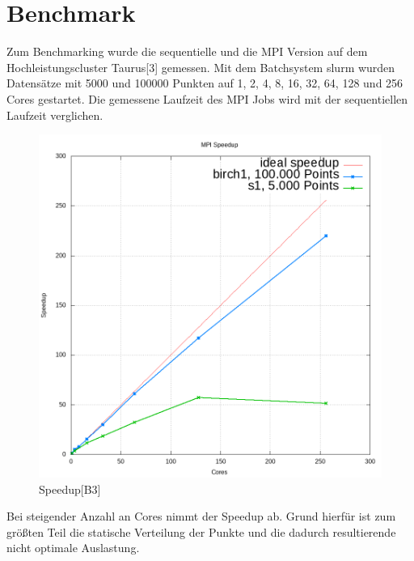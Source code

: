 \section{Benchmark}
	Zum Benchmarking wurde die sequentielle und die MPI Version auf dem Hochleistungscluster Taurus[3] gemessen. Mit dem Batchsystem slurm wurden Datensätze mit
	5000 und 100000 Punkten auf 1, 2, 4, 8, 16, 32, 64, 128 und 256 Cores gestartet. Die gemessene Laufzeit des MPI Jobs wird mit der sequentiellen
	Laufzeit verglichen.\\
	\begin{figure}[H] \centering
		\includegraphics[scale=0.69]{../meanshift/output/pics/speedup.png} 
		\caption{Speedup[B3]}
	\end{figure}
	Bei steigender Anzahl an Cores nimmt der Speedup ab. Grund hierfür ist zum größten Teil die statische Verteilung der Punkte und die dadurch
	resultierende nicht optimale Auslastung.\\
	\newpage
